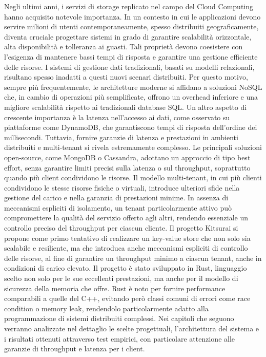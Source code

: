 Negli ultimi anni, i servizi di storage replicato nel campo del Cloud Computing hanno acquisito notevole importanza. 
In un contesto in cui le applicazioni devono servire milioni di utenti contemporaneamente, spesso distribuiti geograficamente, diventa cruciale progettare sistemi in grado di garantire scalabilità orizzontale, alta disponibilità e tolleranza ai guasti.
Tali proprietà devono coesistere con l'esigenza di mantenere bassi tempi di risposta e garantire una gestione efficiente delle risorse.
I sistemi di gestione dati tradizionali, basati su modelli relazionali, risultano spesso inadatti a questi nuovi scenari distribuiti.
Per questo motivo, sempre più frequentemente, le architetture moderne si affidano a soluzioni NoSQL che, in cambio di operazioni più semplificate, offrono un overhead inferiore e una migliore scalabilità rispetto ai tradizionali database SQL.
Un altro aspetto di crescente importanza è la latenza nell'accesso ai dati, come osservato su piattaforme come DynamoDB, che garantiscono tempi di risposta dell'ordine dei millisecondi.
Tuttavia, fornire garanzie di latenza e prestazioni in ambienti distribuiti e multi-tenant si rivela estremamente complesso.
Le principali soluzioni open-source, come MongoDB o Cassandra, adottano un approccio di tipo best effort, senza garantire limiti precisi sulla latenza o sul throughput, soprattutto quando più client condividono le risorse.
Il modello multi-tenant, in cui più clienti condividono le stesse risorse fisiche o virtuali, introduce ulteriori sfide nella gestione del carico e nella garanzia di prestazioni minime.
In assenza di meccanismi espliciti di isolamento, un tenant particolarmente attivo può compromettere la qualità del servizio offerto agli altri, rendendo essenziale un controllo preciso del throughput per ciascun cliente.
Il progetto Kitsurai si propone come primo tentativo di realizzare un key-value store che non solo sia scalabile e resiliente, ma che introduca anche meccanismi espliciti di controllo delle risorse, al fine di garantire un throughput minimo a ciascun tenant, anche in condizioni di carico elevato.
Il progetto è stato sviluppato in Rust, linguaggio scelto non solo per le sue eccellenti prestazioni, ma anche per il modello di sicurezza della memoria che offre.
Rust è noto per fornire performance comparabili a quelle del C++, evitando però classi comuni di errori come race condition o memory leak, rendendolo particolarmente adatto alla programmazione di sistemi distribuiti complessi.
Nei capitoli che seguono verranno analizzate nel dettaglio le scelte progettuali, l’architettura del sistema e i risultati ottenuti attraverso test empirici, con particolare attenzione alle garanzie di throughput e latenza per i client.
